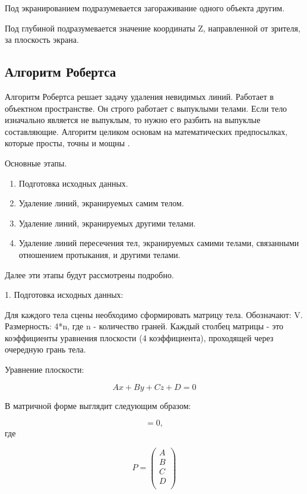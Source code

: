 Под экранированием подразумевается загораживание одного объекта другим.

Под глубиной подразумевается значение координаты Z, направленной от зрителя, за плоскость экрана.

\subsection{Алгоритм Робертса}

Алгоритм Робертса решает задачу удаления невидимых линий. Работает в объектном пространстве. Он строго работает с выпуклыми телами. Если тело изначально является не выпуклым, то нужно его разбить на выпуклые составляющие. Алгоритм целиком основам на математических предпосылках, которые просты, точны и мощны \cite{tr1}.

Основные этапы.
\begin{enumerate}
	\item Подготовка исходных данных.
	\item Удаление линий, экранируемых самим телом.
	\item Удаление линий, экранируемых другими телами.
	\item Удаление линий пересечения тел, экранируемых самими телами, связанными отношением протыкания, и другими телами.
\end{enumerate}

Далее эти этапы будут рассмотрены подробно.

1. Подготовка исходных данных:

Для каждого тела сцены необходимо сформировать матрицу тела. Обозначают: V. Размерность: 4*n, где n - количество граней. Каждый столбец матрицы - это коэффициенты уравнения плоскости (4 коэффициента), проходящей через очередную грань тела.

Уравнение плоскости:

\begin{equation}
	Ax + By + Cz + D = 0
\end{equation}

В матричной форме выглядит следующим образом:

\begin{equation}
	[x\;y\;z\;1][P] = 0,
\end{equation}
где

\begin{equation}
	P = \left(
	\begin{array}{c}
			A \\
			B \\
			C \\
			D \\
		\end{array}
	\right)
\end{equation}

